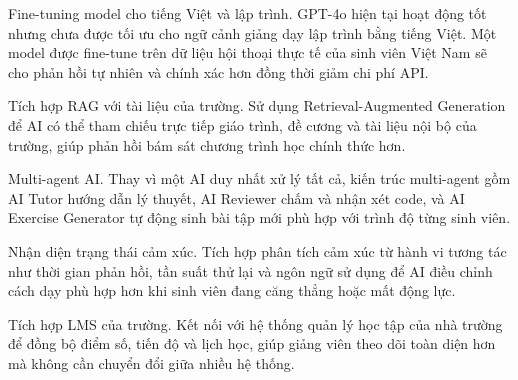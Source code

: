 \documentclass[../main.tex]{subfiles}
\begin{document}
Fine-tuning model cho tiếng Việt và lập trình. GPT-4o hiện tại hoạt động tốt nhưng chưa được tối ưu cho ngữ cảnh giảng dạy lập trình bằng tiếng Việt. Một model được fine-tune trên dữ liệu hội thoại thực tế của sinh viên Việt Nam sẽ cho phản hồi tự nhiên và chính xác hơn đồng thời giảm chi phí API.

Tích hợp RAG với tài liệu của trường. Sử dụng Retrieval-Augmented Generation để AI có thể tham chiếu trực tiếp giáo trình, đề cương và tài liệu nội bộ của trường, giúp phản hồi bám sát chương trình học chính thức hơn.

Multi-agent AI. Thay vì một AI duy nhất xử lý tất cả, kiến trúc multi-agent gồm AI Tutor hướng dẫn lý thuyết, AI Reviewer chấm và nhận xét code, và AI Exercise Generator tự động sinh bài tập mới phù hợp với trình độ từng sinh viên.

Nhận diện trạng thái cảm xúc. Tích hợp phân tích cảm xúc từ hành vi tương tác như thời gian phản hồi, tần suất thử lại và ngôn ngữ sử dụng để AI điều chỉnh cách dạy phù hợp hơn khi sinh viên đang căng thẳng hoặc mất động lực.

Tích hợp LMS của trường. Kết nối với hệ thống quản lý học tập của nhà trường để đồng bộ điểm số, tiến độ và lịch học, giúp giảng viên theo dõi toàn diện hơn mà không cần chuyển đổi giữa nhiều hệ thống.
\end{document}
